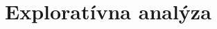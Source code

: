 \documentclass[main.tex]{subfiles}
\begin{document}
	
\section{Exploratívna analýza}	
	
\end{document}

